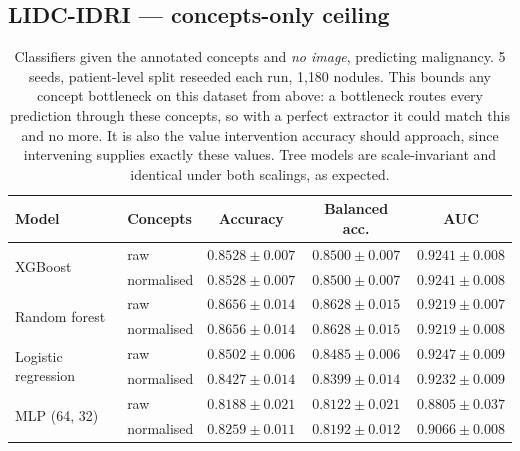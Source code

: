 \documentclass[11pt]{article}
\begin{document}
\subsection{LIDC-IDRI --- concepts-only ceiling}

\begin{table}[h]
\centering
\caption{Classifiers given the annotated concepts and \emph{no image},
predicting malignancy. 5 seeds, patient-level split reseeded each run, 1{,}180
nodules. This bounds any concept bottleneck on this dataset from above: a
bottleneck routes every prediction through these concepts, so with a perfect
extractor it could match this and no more. It is also the value intervention
accuracy should approach, since intervening supplies exactly these values.
Tree models are scale-invariant and identical under both scalings, as expected.}
\label{tab:app-ceiling}
\begin{tabular}{llccc}
\toprule
\textbf{Model} & \textbf{Concepts} & \textbf{Accuracy} &
\textbf{Balanced acc.} & \textbf{AUC} \\
\midrule
\multirow{2}{*}{XGBoost}
 & raw        & $0.8528 \pm 0.007$ & $0.8500 \pm 0.007$ & $0.9241 \pm 0.008$ \\
 & normalised & $0.8528 \pm 0.007$ & $0.8500 \pm 0.007$ & $0.9241 \pm 0.008$ \\
\multirow{2}{*}{Random forest}
 & raw        & $\mathbf{0.8656 \pm 0.014}$ & $\mathbf{0.8628 \pm 0.015}$ & $0.9219 \pm 0.007$ \\
 & normalised & $\mathbf{0.8656 \pm 0.014}$ & $\mathbf{0.8628 \pm 0.015}$ & $0.9219 \pm 0.008$ \\
\multirow{2}{*}{Logistic regression}
 & raw        & $0.8502 \pm 0.006$ & $0.8485 \pm 0.006$ & $\mathbf{0.9247 \pm 0.009}$ \\
 & normalised & $0.8427 \pm 0.014$ & $0.8399 \pm 0.014$ & $0.9232 \pm 0.009$ \\
\multirow{2}{*}{MLP (64, 32)}
 & raw        & $0.8188 \pm 0.021$ & $0.8122 \pm 0.021$ & $0.8805 \pm 0.037$ \\
 & normalised & $0.8259 \pm 0.011$ & $0.8192 \pm 0.012$ & $0.9066 \pm 0.008$ \\
\bottomrule
\end{tabular}
\end{table}
\end{document}
